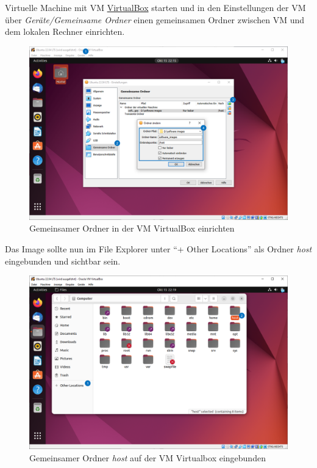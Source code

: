 \documentclass[
  11pt,
  a4paperpaper,
  oneside, openany  ,captions=tableheading
]{scrbook}
\theoremstyle{definition}
\theoremstyle{remark}
\begin{document}
Virtuelle Machine mit VM \href{https://www.virtualbox.org/}{VirtualBox}
starten und in den Einstellungen der VM über \emph{Geräte/Gemeinsame
Ordner} einen gemeinsamen Ordner zwischen VM und dem lokalen Rechner
einrichten.

\begin{figure}[H]

{\centering \includegraphics{images/raspberrypi_image_verkleinern_02.png}

}

\caption{Gemeinsamer Ordner in der VM VirtualBox einrichten}

\end{figure}%

Das Image sollte nun im File Explorer unter ``+ Other Locations'' als
Ordner \emph{host} eingebunden und sichtbar sein.

\begin{figure}[H]

{\centering \includegraphics{images/raspberrypi_image_verkleinern_03.png}

}

\caption{Gemeinsamer Ordner \emph{host} auf der VM Virtualbox
eingebunden}

\end{figure}%
\end{document}

